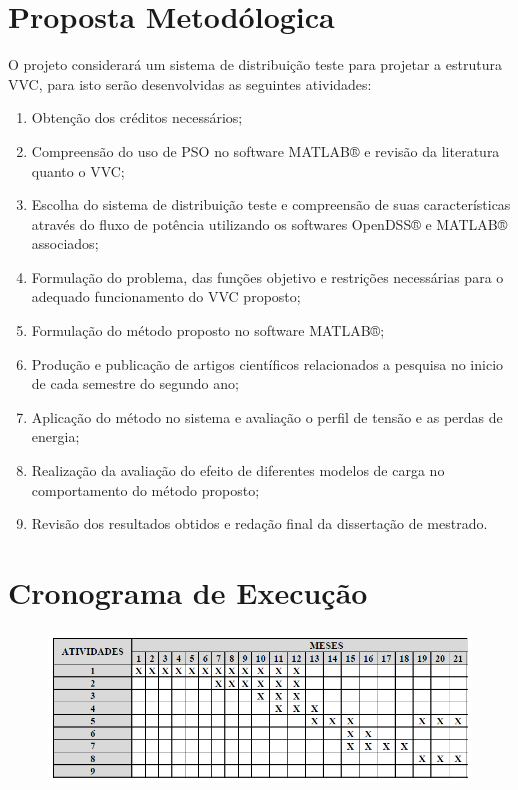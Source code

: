 \documentclass[]{IEEEphot}
\begin{document}
\section{Proposta Metodólogica}
O projeto considerará um sistema de distribuição teste para projetar a estrutura VVC, para isto serão desenvolvidas as seguintes atividades:
\begin{enumerate}
	\item Obtenção dos créditos necessários;
	\item Compreensão do uso de PSO no software MATLAB® e revisão da literatura quanto o VVC;
	\item Escolha do sistema de distribuição teste e compreensão de suas características através do fluxo de potência utilizando os softwares OpenDSS® e MATLAB® associados;
	\item Formulação do problema, das funções objetivo e restrições necessárias para o adequado funcionamento do VVC proposto;
	\item Formulação do método proposto no software MATLAB®;
	\item Produção e publicação de artigos científicos relacionados a pesquisa no inicio de cada semestre do segundo ano;
	\item Aplicação do método no sistema e avaliação o perfil de tensão e as perdas de energia;
	\item  Realização da avaliação do efeito de diferentes modelos de carga no comportamento do método proposto;
	\item Revisão dos resultados obtidos e redação final da dissertação de mestrado.
\end{enumerate}
\section{Cronograma de Execução}
\begin{figure}[!htbp]
	\centering
	\includegraphics[scale=0.5]{cronograma}
\end{figure}
\nocite{*}


\end{document}
